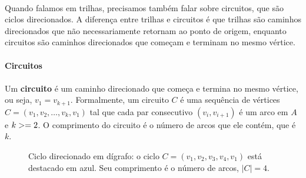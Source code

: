 \documentclass[12pt,a4paper]{article}
\def\\{}%
\def\geq{\string>=}%
\begin{document}
\paragraph{}
Quando falamos em trilhas, precisamos também falar sobre circuitos, que são ciclos direcionados.
A diferença entre trilhas e circuitos é que trilhas são caminhos direcionados que não necessariamente retornam ao ponto de origem, enquanto circuitos são caminhos direcionados que começam e terminam no mesmo vértice.

\paragraph{Circuitos}
\paragraph{}
 Um \textbf{circuito} é um caminho direcionado que começa e termina no mesmo vértice, ou seja, \(v_1 = v_{k+1}\). Formalmente, um circuito \(C\) é uma sequência de vértices \(C = (v_1, v_2, \ldots, v_k, v_1)\) tal que cada par consecutivo \((v_i, v_{i+1})\) é um arco em \(A\) e \(k \geq 2\). O comprimento do circuito é o número de arcos que ele contém, que é \(k\).

\begin{figure}[H]
\centering
{}
\caption{Ciclo direcionado em dígrafo: o ciclo $C=(v_1,v_2,v_3,v_4,v_1)$ está destacado em azul. Seu comprimento é o número de arcos, $|C|=4$.}
\label{fig:ciclo-direcionado}
\end{figure}
\end{document}
